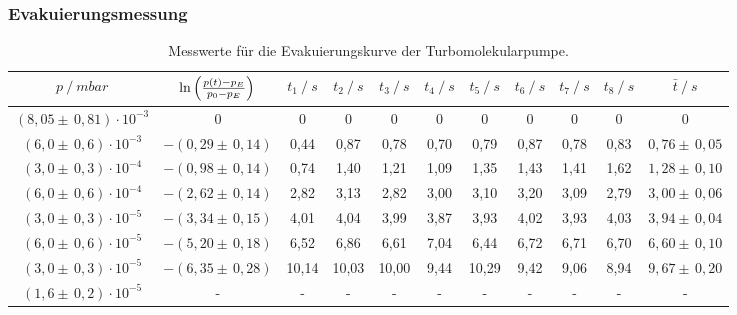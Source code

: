 \subsubsection{Evakuierungsmessung}
\begin{table}[H]
\tiny
\centering
\label{tab:EvakuierungskurveTurbo}
\begin{tabular}{c|c|c|c|c|c|c|c|c|c|c}
{$p \:/\: \si{mbar}$} & {$\ln{\Bigl( \frac{p(t)-p_E}{p_0-p_E}\Bigr)}$} & {$t_1 \:/\: \si{s} $} & {$t_2 \:/\: \si{s}$} & {$t_3 \:/\: \si{s}$} & {$t_4 \:/\: \si{s}$} & {$t_5 \:/\: \si{s}$} & {$t_6 \:/\: \si{s}$}& {$t_7 \:/\: \si{s}$} & {$t_8 \:/\: \si{s}$} & {$\bar{t} \:/\: \si{s}$}\\
\midrule
$(8,05 \pm \, 0,81)\cdot 10^{-3}$ & 0 & 0 &  0 & 0 & 0 & 0 & 0 & 0 & 0 & 0\\
$(6,0 \pm \, 0,6)\cdot 10^{-3}$ & $-(0,29 \pm \, 0,14)$ & 0,44 & 0,87 & 0,78 & 0,70 & 0,79 & 0,87 & 0,78 & 0,83 & $0,76 \pm \, 0,05$\\
$(3,0 \pm \, 0,3)\cdot 10^{-4}$ & $-(0,98 \pm \, 0,14)$ & 0,74 & 1,40 & 1,21 & 1,09 & 1,35 & 1,43 & 1,41 & 1,62 & $1,28 \pm \, 0,10$\\
$(6,0 \pm \, 0,6)\cdot 10^{-4}$ & $-(2,62 \pm \, 0,14)$ & 2,82 & 3,13 & 2,82 & 3,00 & 3,10 & 3,20 & 3,09 & 2,79 & $3,00 \pm \, 0,06$\\
$(3,0 \pm \, 0,3)\cdot 10^{-5}$ & $-(3,34 \pm \, 0,15)$ & 4,01 & 4,04 & 3,99 & 3,87 & 3,93 & 4,02 & 3,93 & 4,03 & $3,94 \pm \, 0,04$\\
$(6,0 \pm \, 0,6)\cdot 10^{-5}$ & $-(5,20 \pm \, 0,18)$ & 6,52 & 6,86 & 6,61 & 7,04 & 6,44 & 6,72 & 6,71 & 6,70 & $6,60 \pm \, 0,10$\\
$(3,0 \pm \, 0,3)\cdot 10^{-5}$ & $-(6,35 \pm \, 0,28)$ & 10,14 & 10,03 & 10,00 & 9,44 & 10,29 & 9,42 & 9,06 & 8,94 & $9,67 \pm \, 0,20$\\
$(1,6 \pm \, 0,2)\cdot 10^{-5}$& - & - &  -& -& -& -& -& -& -& - \\
\end{tabular}
\caption{Messwerte für die Evakuierungskurve der Turbomolekularpumpe.}
\end{table}

